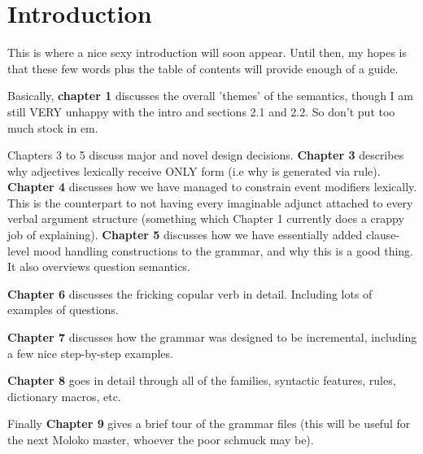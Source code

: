 \section{Introduction}

This is where a nice sexy introduction will soon appear. Until then, my hopes is that these few words plus the table of contents will provide enough of a guide.

Basically, \textbf{chapter 1} discusses the overall 'themes' of the semantics, though I am still VERY unhappy with the intro and sections 2.1 and 2.2. So don't put too much stock in em.

Chapters 3 to 5 discuss major and novel design decisions. \textbf{Chapter 3} describes why adjectives lexically receive ONLY  form (i.e why  \fwdsl{}   is generated via rule). \textbf{Chapter 4} discusses how we have managed to constrain event modifiers lexically. This is the counterpart to not having every imaginable adjunct attached to every verbal argument structure (something which Chapter 1 currently does a crappy job of explaining). \textbf{Chapter 5} discusses how we have essentially added clause-level mood handling constructions to the grammar, and why this is a good thing. It also overviews question semantics.

\textbf{Chapter 6} discusses the fricking copular verb in detail. Including lots of examples of questions.

\textbf{Chapter 7} discusses how the grammar was designed to be incremental, including a few nice step-by-step examples.

\textbf{Chapter 8} goes in detail through all of the families, syntactic features, rules, dictionary macros, etc.

Finally \textbf{Chapter 9} gives a brief tour of the grammar files (this will be useful for the next Moloko master,  whoever the poor schmuck may be).


